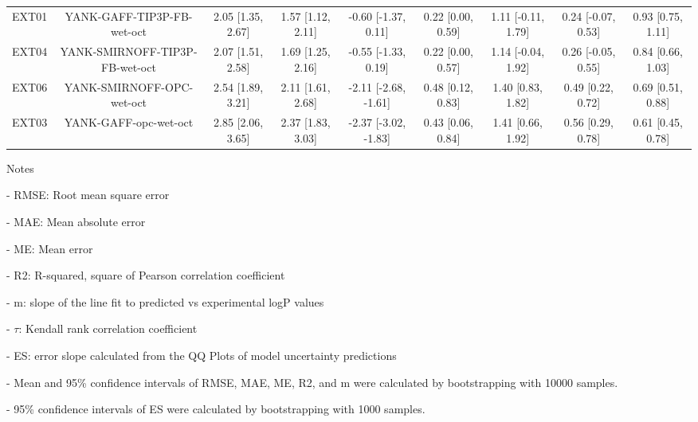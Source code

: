 \documentclass{article}
\begin{document}
\begin{center}
\begin{longtable}{|ccccccccc|}
 EXT01 &      YANK-GAFF-TIP3P-FB-wet-oct &  2.05 [1.35, 2.67] &  1.57 [1.12, 2.11] &   -0.60 [-1.37, 0.11] &  0.22 [0.00, 0.59] &  1.11 [-0.11, 1.79] &  0.24 [-0.07, 0.53] &  0.93 [0.75, 1.11] \\
 EXT04 &  YANK-SMIRNOFF-TIP3P-FB-wet-oct &  2.07 [1.51, 2.58] &  1.69 [1.25, 2.16] &   -0.55 [-1.33, 0.19] &  0.22 [0.00, 0.57] &  1.14 [-0.04, 1.92] &  0.26 [-0.05, 0.55] &  0.84 [0.66, 1.03] \\
 EXT06 &       YANK-SMIRNOFF-OPC-wet-oct &  2.54 [1.89, 3.21] &  2.11 [1.61, 2.68] &  -2.11 [-2.68, -1.61] &  0.48 [0.12, 0.83] &   1.40 [0.83, 1.82] &   0.49 [0.22, 0.72] &  0.69 [0.51, 0.88] \\
 EXT03 &           YANK-GAFF-opc-wet-oct &  2.85 [2.06, 3.65] &  2.37 [1.83, 3.03] &  -2.37 [-3.02, -1.83] &  0.43 [0.06, 0.84] &   1.41 [0.66, 1.92] &   0.56 [0.29, 0.78] &  0.61 [0.45, 0.78] \\
\end{longtable}
\end{center}

Notes

- RMSE: Root mean square error

- MAE: Mean absolute error

- ME: Mean error

- R2: R-squared, square of Pearson correlation coefficient

- m: slope of the line fit to predicted vs experimental logP values

- $\tau$:  Kendall rank correlation coefficient

- ES: error slope calculated from the QQ Plots of model uncertainty predictions

- Mean and 95\% confidence intervals of RMSE, MAE, ME, R2, and m were calculated by bootstrapping with 10000 samples.

- 95\% confidence intervals of ES were calculated by bootstrapping with 1000 samples.\end{document}
\end{document}
